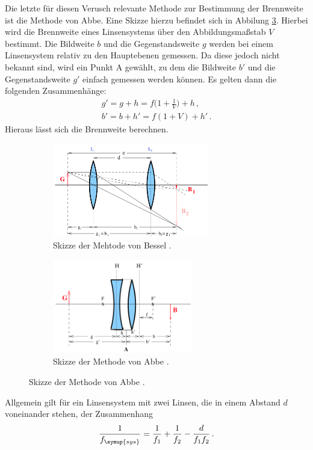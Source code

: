 Die letzte für diesen Verusch relevante Methode zur Bestimmung der Brennweite ist
die Methode von Abbe. Eine Skizze hierzu befindet sich in Abbilung \ref{fig:abbe}.
Hierbei wird die Brennweite eines Linsensystems über den Abbildungsmaßstab $V$ bestimmt.
Die Bildweite $b$ und die Gegenstandsweite $g$ werden bei einem Linsensystem relativ zu den
Hauptebenen gemessen. Da diese jedoch nicht bekannt sind, wird ein Punkt A gewählt, zu dem
die Bildweite $b'$ und die Gegenstandsweite $g'$ einfach gemessen werden können. Es
gelten dann die folgenden Zusammenhänge:
\begin{align}
  g'=g+h=f\biggl(1+\frac{1}{V}\biggr)+h \,,\\
  b'=b+h'=f(1+V)+h'\,.
\end{align}
Hieraus lässt sich die Brennweite berechnen.

\begin{figure}
  \centering
  \begin{subfigure}{0.48\textwidth}
    \includegraphics[height=4.1cm]{data/bessel.png}
    \caption{Skizze der Mehtode von Bessel \cite{Versuchsanleitung}.}
    \label{fig:bessel}
  \end{subfigure}
  \begin{subfigure}{0.48\textwidth}
    \centering
    \includegraphics[height=4.1cm]{data/abbe.png}
    \caption{Skizze der Methode von Abbe \cite{Versuchsanleitung}.}
    \label{fig:abbe}
  \end{subfigure}
\end{figure}

Allgemein gilt für ein Linsensystem mit zwei Linsen, die in einem Abstand $d$
voneinander stehen, der Zusammenhang
\begin{equation}
  \frac{1}{f_{\symup{sys}}}=\frac{1}{f_1}+\frac{1}{f_2}-\frac{d}{f_1 f_2} \,.
  \label{eqn:system}
\end{equation}
